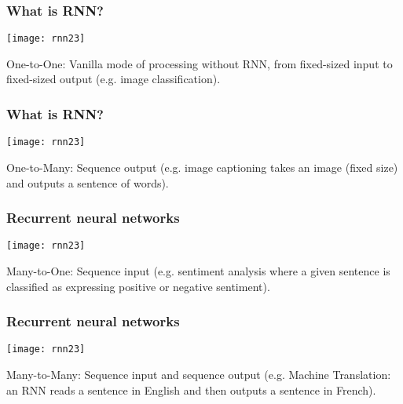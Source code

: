 \begin{frame}[fragile] \frametitle{What is RNN?}

\begin{center}
\texttt{[image: rnn23]}
\end{center}
One-to-One: Vanilla mode of processing without RNN, from fixed-sized input to fixed-sized output (e.g. image classification).
\end{frame}

\begin{frame}[fragile] \frametitle{What is RNN?}

\begin{center}
\texttt{[image: rnn23]}
\end{center}
One-to-Many: Sequence output (e.g. image captioning takes an image (fixed size) and outputs a sentence of words).
\end{frame}


\begin{frame}[fragile] \frametitle{Recurrent neural networks}
\begin{center}
\texttt{[image: rnn23]}
\end{center}
Many-to-One: Sequence input (e.g. sentiment analysis where a given sentence is classified as expressing positive or negative sentiment).
\end{frame}

\begin{frame}[fragile] \frametitle{Recurrent neural networks}
\begin{center}
\texttt{[image: rnn23]}
\end{center}
Many-to-Many: Sequence input and sequence output (e.g. Machine Translation: an RNN reads a sentence in English and then outputs a sentence in French).
\end{frame}


